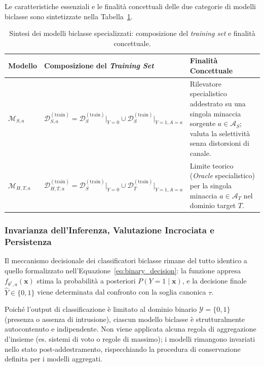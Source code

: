 Le caratteristiche essenziali e le finalità concettuali delle due categorie di modelli biclasse sono sintetizzate nella Tabella~\ref{tab:modelli_biclasse}.

\begin{table}[H]
    \centering
    \caption{Sintesi dei modelli biclasse specializzati: composizione del \textit{training set} e finalità concettuale.}
    \label{tab:modelli_biclasse}
    \begin{tabularx}{\textwidth}{l l >{\raggedright\arraybackslash}X }
    \toprule
    \textbf{Modello} & \textbf{Composizione del \textit{Training Set}} & \textbf{Finalità Concettuale} \\
    \midrule
    $\mathcal{M}_{S, a}$ &
    $\mathcal{D}_{S, a}^{(\text{train})} = \mathcal{D}_{S}^{(\text{train})}\big|_{Y=0} \cup \mathcal{D}_{S}^{(\text{train})}\big|_{Y=1, A=a}$ &
    Rilevatore specialistico addestrato su una singola minaccia sorgente $a \in \mathcal{A}_S$; valuta la selettività senza distorsioni di canale. \\
    \addlinespace
    $\mathcal{M}_{H, T, a}$ &
    $\mathcal{D}_{H, T, a}^{(\text{train})} = \mathcal{D}_{S}^{(\text{train})}\big|_{Y=0} \cup \mathcal{D}_{T}^{(\text{train})}\big|_{Y=1, A=a}$ &
    Limite teorico (\textit{Oracle} specialistico) per la singola minaccia $a \in \mathcal{A}_T$ nel dominio target $T$. \\
    \bottomrule
    \end{tabularx}
\end{table}

\subsubsection{Invarianza dell'Inferenza, Valutazione Incrociata e Persistenza}
\label{subsubsec:invarianza_biclasse}
Il meccanismo decisionale dei classificatori biclasse rimane del tutto identico a quello formalizzato nell'Equazione~\eqref{eq:binary_decision}: la funzione appresa $f_{\theta^*, a}(\mathbf{x})$ stima la probabilità a posteriori $P(Y = 1 \mid \mathbf{x})$, e la decisione finale $\hat{Y} \in \{0, 1\}$ viene determinata dal confronto con la soglia canonica $\tau$.

Poiché l'output di classificazione è limitato al dominio binario $\mathcal{Y} = \{0, 1\}$ (presenza o assenza di intrusione), ciascun modello biclasse è strutturalmente autocontenuto e indipendente. Non viene applicata alcuna regola di aggregazione d'insieme (es. sistemi di voto o regole di massimo); i modelli rimangono invariati nello stato post-addestramento, rispecchiando la procedura di conservazione definita per i modelli aggregati.

